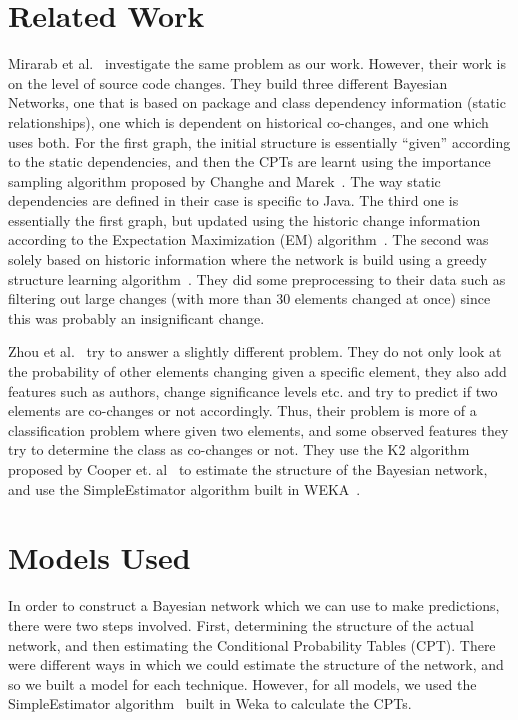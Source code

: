 \documentclass{article}
\begin{document}
\section{Related Work}
\label{rel-work}

Mirarab et al.~\cite{mirarab2007} investigate the same problem as our work. However, their work is on the level of source code changes. They build three
different Bayesian Networks, one that is based on package and class dependency information (static relationships), one which is dependent on historical
co-changes, and one which uses both. For the first graph, the initial structure is essentially ``given'' according to the static dependencies, and then the CPTs
are learnt using the importance sampling algorithm proposed by Changhe and Marek~\cite{yuan2003importance}. The way static dependencies are defined in their
case is specific to Java. The third one is essentially the first graph, but updated using the historic change information according to the Expectation
Maximization (EM) algorithm~\cite{dempster1977maximum}. The second was solely based on historic information where the network is build using a greedy structure
 learning algorithm~\cite{friedman1996learning}. They did some preprocessing to their data such as filtering out large changes (with more than 30 elements
changed at once) since this was probably an insignificant change.

Zhou et al.~\cite{zhou2008} try to answer a slightly different problem. They do not only look at the probability of other elements changing given a specific
element, they also add features such as authors, change significance levels etc. and try to predict if two elements are co-changes or not accordingly. Thus,
their problem is more of a classification problem where given two elements, and some observed features they try to determine the class as co-changes or not.
They use the K2 algorithm proposed by Cooper et. al~\cite{cooper1992bayesian} to estimate the structure of the Bayesian network, and use the SimpleEstimator
algorithm built in WEKA~\cite{witten2005data}.

\section{Models Used}
\label{sec:modelsused}

In order to construct a Bayesian network which we can use to make predictions, there were two steps involved. First, determining the structure of the actual
network, and then estimating the Conditional Probability Tables (CPT). There were different ways in which we could estimate the structure of the network, and
so we built a model for each technique. However, for all models, we used the SimpleEstimator algorithm~\cite{written2005data} built in Weka to calculate the
CPTs. 
\end{document}
